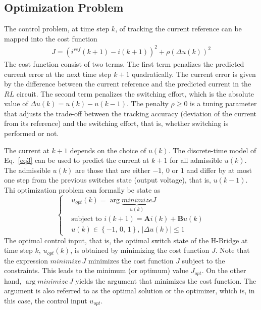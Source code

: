 \documentclass[11pt,a4paper,oneside]{book}
\numberwithin{equation}{section}
\newcommand{\abs}[1]{\big|#1\big|}
\theoremstyle{it}
\theoremstyle{definition}
\begin{document}
\subsection{Optimization Problem} 
The control problem, at time step $k$, of tracking the current reference can be 
mapped into the cost function
\begin{equation}\label{eq6}
	\begin{aligned}
		J = (i^{ref}(k+1)-i(k+1))^2+\rho\left( \Delta u(k)\right) ^2
	\end{aligned}
\end{equation}
The cost function consist of two terms. The first term penalizes the predicted 
current error at the next time step $k+1$ quadratically. The current error is 
given by the difference between the current reference and the predicted current 
in the $RL$ circuit. The second term penalizes the switching effort, which is 
the absolute value of $\Delta u(k) = u(k)-u(k-1)$. The penalty $\rho \ge 0$ is 
a tuning parameter that adjusts the trade-off between the tracking accuracy 
(deviation of the current from its reference) and the switching effort, that 
is, whether switching is performed or not.

The current at $k+1$ depends on the choice of $u(k)$. The discrete-time model 
of Eq.~\eqref{eq3} can be used to predict the current at $k+1$ for all 
admissible $u(k)$. The admissible $u(k)$ are those that are either $-1$, $0$ or 
$1$ and differ by at most one step from the previous switches state (output 
voltage), that is, $u(k-1)$. Thi optimization problem can formally be state as
\begin{equation}\label{eq7}
	\left\lbrace \begin{aligned}
		& u_{opt}(k) = \arg \underbrace{{minimize}}_{u(k)} J \\[6pt]
		& \text{subject to } i(k+1)=\mathbf{A}i(k)+\mathbf{B}u(k) \\[6pt]
		& u(k) \in \left\lbrace -1,\,0,\,1\right\rbrace,\, \abs{\Delta u(k)} 
		\le 1
	\end{aligned}\right. 
\end{equation}
The optimal control input, that is, the optimal switch state of the H-Bridge at 
time step $k$, $u_{opt}(k)$, is obtained by minimizing the cost function $J$. 
Note that the expression $minimize\,J$ minimizes the cost function $J$ subject 
to the constraints. This leads to the minimum (or optimum) value $J_{opt}$. On 
the other hand, $\arg minimize\,J$ yields the argument that minimizes the cost 
function. The argument is also referred to as the optimal solution or the 
optimizer, which is, in this case, the control input $u_{opt}$.
\end{document}
